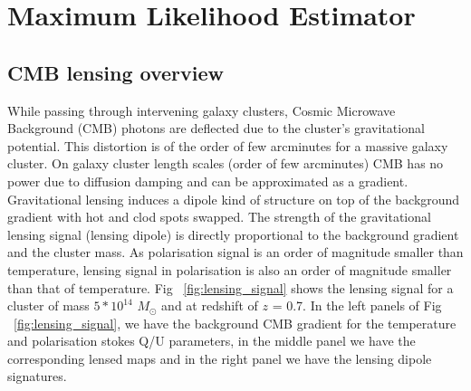 \chapter{Maximum Likelihood Estimator}
\label{ch:MLE}
\section{CMB lensing overview}
While passing through intervening galaxy clusters, Cosmic Microwave Background (CMB) photons are deflected due to the cluster's gravitational potential. 
This distortion is of the order of few arcminutes for a massive galaxy cluster.
On galaxy cluster length scales (order of few arcminutes) CMB has no power due to diffusion damping \citep{silk68} and can be approximated as a gradient. 
Gravitational lensing induces a dipole kind of structure on top of the background gradient with hot and clod spots swapped. 
The strength of the gravitational lensing signal (lensing dipole) is directly proportional to the background gradient and the cluster mass. 
As polarisation signal is an order of magnitude smaller than temperature, lensing signal in polarisation is also an order of magnitude smaller than that of temperature. 
Fig ~\ref{fig:lensing_signal} shows the lensing signal for a cluster of mass $5*10^{14}$ $M_{\odot}$ and at redshift of $z$ = 0.7.
In  the left panels of Fig ~\ref{fig:lensing_signal}, we have the background CMB gradient for the temperature and polarisation stokes Q/U parameters, in the middle panel we have the corresponding lensed maps and in the right panel we have the lensing dipole signatures.

